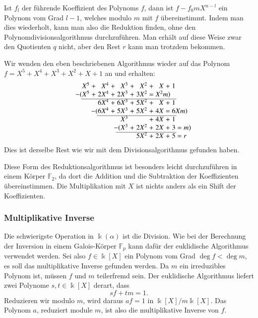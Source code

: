 Ist $f_l$ der führende Koeffizient des Polynoms $f$, dann ist
$f-f_0mX^{n-l}$ ein Polynom vom Grad $l-1$, welches modulo $m$
mit $f$ übereinstimmt.
Indem man dies wiederholt, kann man also die Reduktion finden, ohne
den Polynomdivisionsalgorithmus durchzuführen.
Man erhält auf diese Weise zwar den Quotienten $q$ nicht, aber den
Rest $r$ kann man trotzdem bekommen.

\begin{beispiel}
Wir wenden den eben beschriebenen Algorithmus wieder auf das
Polynom $f=X^5+X^4+X^3+X^2+X+1$ an und erhalten:
\[
\arraycolsep=1.4pt
\begin{array}{rcrcrcrcrcr}
X^5&+& X^4&+& X^3&+& X^2&+& X&+&1\\
\llap{$-($}X^5&+&2X^4&+&2X^3&+&3X^2\rlap{$\mathstrut =X^2m)$}& &  & & \\
\cline{1-11}
   & &6X^4&+&6X^3&+&5X^2&+& X&+&1\\
   & &\llap{$-($}6X^4&+&5X^3&+&5X^2&+&4X\rlap{$\mathstrut =6Xm)$}& & \\
\cline{3-11}
   & &    & & X^3& &    &+&4X&+&1\\
   & &    & & \llap{$-($}X^3&+&2X^2&+&2X&+&3\rlap{$\mathstrut =m)$}\\
\cline{5-11}
   & &    & &    & &5X^2&+&2X&+&5\rlap{$\mathstrut =r$}\\
\end{array}
\]
Dies ist derselbe Rest wie wir mit dem Divisionsalgorithmus
gefunden haben.
\end{beispiel}

Diese Form des Reduktionsalgorithmus ist besonders leicht durchzuführen
in einem Körper $\mathbb{F}_2$, da dort die Addition und die Subtraktion
der Koeffizienten übereinstimmen.
Die Multiplikation mit $X$ ist nichts anders als ein Shift der
Koeffizienten.

\subsubsection{Multiplikative Inverse}
Die schwierigste Operation in $\Bbbk(\alpha)$ ist die Division.
Wie bei der Berechnung der Inversion in einem Galois-Körper $\mathbb{F}_p$
kann dafür der euklidische Algorithmus verwendet werden.
Sei also $f\in\Bbbk[X]$ ein Polynom vom Grad $\deg f <\deg m$, es soll
das multiplikative Inverse gefunden werden.
Da $m$ ein irreduzibles Polynom ist, müssen $f$ und $m$ teilerfremd sein.
Der euklidische Algorithmus liefert zwei Polynome $s,t\in\Bbbk[X]$ derart,
dass
\[
sf+tm=1.
\]
Reduzieren wir modulo $m$, wird daraus $af=1$ in $\Bbbk[X]/m\Bbbk[X]$.
Das Polynom $a$, reduziert module $m$, ist also die multiplikative
Inverse von $f$.

